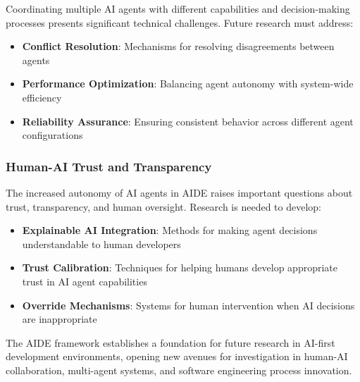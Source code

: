 Coordinating multiple AI agents with different capabilities and decision-making processes presents significant technical challenges. Future research must address:

\begin{itemize}
    \item \textbf{Conflict Resolution}: Mechanisms for resolving disagreements between agents
    \item \textbf{Performance Optimization}: Balancing agent autonomy with system-wide efficiency
    \item \textbf{Reliability Assurance}: Ensuring consistent behavior across different agent configurations
\end{itemize}

\subsubsection{Human-AI Trust and Transparency}

The increased autonomy of AI agents in AIDE raises important questions about trust, transparency, and human oversight. Research is needed to develop:

\begin{itemize}
    \item \textbf{Explainable AI Integration}: Methods for making agent decisions understandable to human developers
    \item \textbf{Trust Calibration}: Techniques for helping humans develop appropriate trust in AI agent capabilities
    \item \textbf{Override Mechanisms}: Systems for human intervention when AI decisions are inappropriate
\end{itemize}

The AIDE framework establishes a foundation for future research in AI-first development environments, opening new avenues for investigation in human-AI collaboration, multi-agent systems, and software engineering process innovation.
